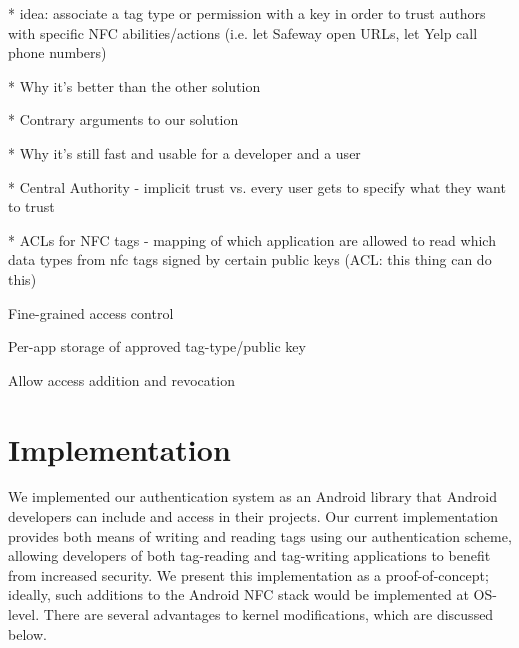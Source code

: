 \documentclass[12pt]{article}
\begin{document}
% 
% 

* idea: associate a tag type or permission with a key in order to trust authors with specific NFC abilities/actions (i.e. let Safeway open URLs, let Yelp call phone numbers)

* Why it's better than the other solution

* Contrary arguments to our solution

* Why it's still fast and usable for a developer and a user

* Central Authority - implicit trust vs. every user gets to specify what they want to trust
 
* ACLs for NFC tags - mapping of which application are allowed to read which data types from nfc tags signed by certain public keys (ACL: this thing can do this)

Fine-grained access control

Per-app storage of approved tag-type/public key

Allow access addition and revocation



\section{Implementation}
We implemented our authentication system as an Android library that Android developers can include and access in their projects.
Our current implementation provides both means of writing and reading tags using our authentication scheme, allowing developers of both tag-reading and tag-writing applications to benefit from increased security.
We present this implementation as a proof-of-concept; ideally, such additions to the Android NFC stack would be implemented at OS-level.
There are several advantages to kernel modifications, which are discussed below.
\end{document}

